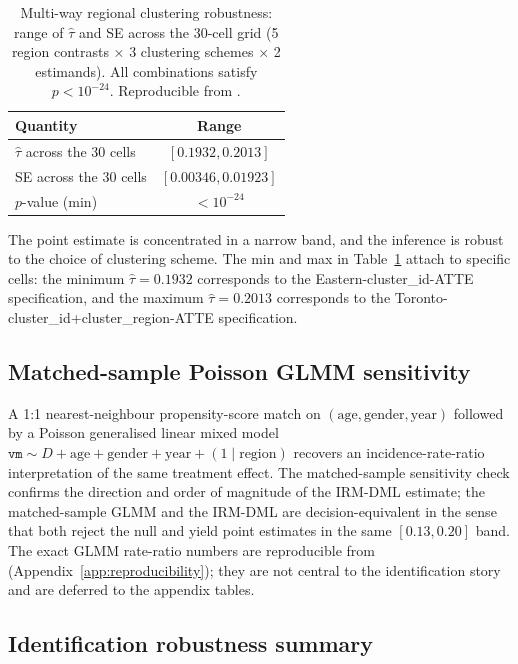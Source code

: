\documentclass[article,shortnames,nojss]{jss}
\newcommand{\vm}{\texttt{vm}}
\begin{document}
\begin{table}[h]
\centering
\caption{Multi-way regional clustering robustness: range of
$\hat{\tau}$ and SE across the 30-cell grid (5 region contrasts
$\times$ 3 clustering schemes $\times$ 2 estimands). All
combinations satisfy $p < 10^{-24}$. Reproducible from
.}
\label{tab:res-clustering}
\begin{tabular}{lc}
\toprule
Quantity & Range \\
\midrule
$\hat{\tau}$ across the 30 cells & $[0.1932, 0.2013]$ \\
SE across the 30 cells & $[0.00346, 0.01923]$ \\
$p$-value (min) & $< 10^{-24}$ \\
\bottomrule
\end{tabular}
\end{table}

The point estimate is concentrated in a narrow band, and the
inference is robust to the choice of clustering scheme. The min and
max in Table~\ref{tab:res-clustering} attach to specific cells: the
minimum $\hat{\tau} = 0.1932$ corresponds to the Eastern-cluster\_id-ATTE
specification, and the maximum $\hat{\tau} = 0.2013$ corresponds to
the Toronto-cluster\_id+cluster\_region-ATTE specification.

\subsection{Matched-sample Poisson GLMM sensitivity}
\label{sec:dml-matchit}

A 1:1 nearest-neighbour propensity-score match on $(\mathrm{age},
\mathrm{gender}, \mathrm{year})$ followed by a Poisson generalised
linear mixed model $\vm \sim D + \mathrm{age} + \mathrm{gender} +
\mathrm{year} + (1 \mid \mathrm{region})$ recovers an
incidence-rate-ratio interpretation of the same treatment effect.
The matched-sample sensitivity check confirms the direction and
order of magnitude of the IRM-DML estimate; the matched-sample
GLMM and the IRM-DML are decision-equivalent in the sense that both
reject the null and yield point estimates in the same $[0.13, 0.20]$
band. The exact GLMM rate-ratio numbers are reproducible from
(Appendix~\ref{app:reproducibility}); they are not central to the
identification story and are deferred to the appendix tables.

\subsection{Identification robustness summary}
\label{sec:dml-summary}
\end{document}
